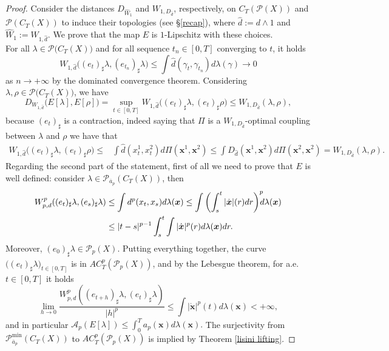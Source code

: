 \documentclass[10pt,leqno]{amsart}
\numberwithin{equation}{section}
\newcommand{\PP}{\mathcal{P}}
\begin{document}
\begin{proof}
    Consider the distances $D_{\hat{W}_1}$ and $W_{1,D_{\hat{d}}}$, respectively, on $C_T(\PP(X))$ and $\PP(C_T(X))$ to induce their topologies (see §\ref{recap}), where $\hat{d} := d\wedge 1$ and $\hat{W}_1 := W_{1,\hat{d}}$. We prove that the map $E$ is $1$-Lipschitz with these choices.
    \\
    For all $\lambda \in \PP\big(C_T(X)\big)$ and for all sequence $t_n\in [0,T]$ converging to $t$, it holds
    \[W_{1,\hat{d}}\big((e_t)_\sharp \lambda,(e_{t_n})_\sharp \lambda\big) \leq \int \hat{d}(\gamma_t,\gamma_{t_n}) d\lambda(\gamma) \to 0\]
    as $n\to +\infty$ by the dominated convergence theorem. Considering $\lambda,\rho \in \PP\big(C_T(X)\big)$, we have
    \[D_{W_{1,\hat{d}}}\big(E[\lambda],E[\rho]\big) = \sup_{t\in [0,T]} W_{1,\hat{d}}\big((e_t)_\sharp \lambda,(e_{t})_\sharp \rho\big) \leq W_{1,D_{\hat{d}}}(\lambda,\rho),\]
    because $(e_t)_\sharp $ is a contraction, indeed saying that $\Pi$ is a $W_{1,D_{\hat{d}}}$-optimal coupling between $\lambda$ and $\rho$ we have that 
    \[
    \begin{aligned} W_{1,\hat{d}}\big((e_t)_\sharp \lambda,(e_{t})_\sharp \rho\big) \leq & \int \hat{d}(x^1_t, x^2_t ) d\Pi(\boldsymbol{x}^1,\boldsymbol{x}^2) 
    \leq \int D_{\hat{d}}(\boldsymbol{x}^1,\boldsymbol{x}^2) d\Pi(\boldsymbol{x}^2,\boldsymbol{x}^2) = W_{1,D_{\hat{d}}}(\lambda, \rho).
    \end{aligned}
    \]
    Regarding the second part of the statement, first of all we need to prove that $E$ is well defined: consider $\lambda \in \PP_{\overline{a}_p}(C_T(X))$, then
    \begin{align*}
        W_{p,d}^p((e_t)_{\sharp }\lambda,(e_s)_{\sharp }\lambda ) 
        &\leq 
        \int d^p(x_t,x_s) d\lambda(\boldsymbol{x})
        \leq 
        \int \left(\int_s^t |\dot{\boldsymbol{x}}|(r) dr \right)^p\hspace{-0.2cm} d\lambda(\boldsymbol{x})
        \\
        &\leq 
        |t-s|^{p-1}\int_s^t\int |\dot{\boldsymbol{x}}|^p(r) d\lambda(\boldsymbol{x}) dr.
    \end{align*}
    Moreover, $(e_0)_\sharp \lambda \in \PP_p(X)$. Putting everything together, the curve $\big((e_t)_\sharp \lambda\big)_{t\in[0,T]}$ is in $AC^p_T(\PP_p(X))$, and by the Lebesgue theorem, for a.e. $t\in[0,T]$ it holds
    \[\lim_{h\to 0}\frac{W_{p,d}^p((e_{t+h})_{\sharp }\lambda,(e_t)_{\sharp }\lambda )}{|h|^p} \leq \int |\dot{\boldsymbol{x}}|^p(t) d\lambda(\boldsymbol{x})<+\infty, \]
    and in particular
    \(\mathcal{A}_p(E[\lambda]) \leq \int_0^T a_p(\boldsymbol{x}) d\lambda(\boldsymbol{x}).\)  
    The surjectivity from $\PP_{\overline{a}_p}^{\operatorname{min}}(C_T(X))$ to $AC_T^p(\PP_p(X))$ is implied by Theorem \ref{lisini lifting}.
\end{proof}
\end{document}
